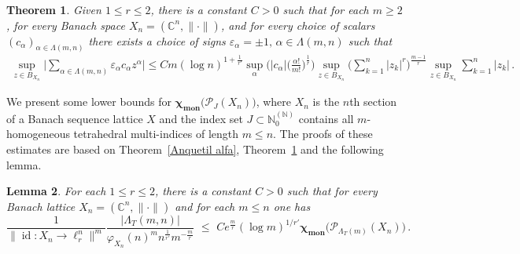 \documentclass[12pt]{amsart}
\numberwithin{subsection}{section}
\newtheorem{theorem}{Theorem}[section]
\newtheorem{lemma}[theorem]{Lemma}
\theoremstyle{definition}
\theoremstyle{remark}
\DeclareMathOperator{\mon}{mon}
\DeclareMathOperator{\id}{\mathrm{id}}
\newcommand{\chimon}{\chi_{\mon}}
\begin{document}
\medskip

\begin{theorem} \label{Hinault alfa}
Given  $1 \leq r \leq 2$, there is a constant $C >0$ such that for each  $m \geq 2$, for every Banach space $X_n = (\mathbb{C}^n,\|\cdot\|)$,
and for every choice of scalars $(c_{\alpha})_{\alpha \in \Lambda(m,n)}$ there exists a choice of signs $\varepsilon_{\alpha} = \pm1, \, \alpha \in \Lambda(m,n)$ such that
\begin{align*}
\sup_{z \in B_{X_n}} \Big\vert \sum_{\alpha \in \Lambda(m,n)} \varepsilon_{\alpha} c_{\alpha} z^{\alpha} \Big\vert
\leq C m (\log n)^{1+\frac{1}{r'}}   \sup_{\alpha}  \bigg( \vert c_{\alpha} \vert \Big( \frac{\alpha !}{m!} \Big)^{\frac{1}{r}} \bigg)
\sup_{z \in B_{X_n}} \Big( \sum_{k=1}^{n} \vert z_{k} \vert^{r} \Big)^{\frac{m-1}{r}}  \sup_{z \in B_{X_n}} \sum_{k=1}^{n} \vert z_{k} \vert\,.
\end{align*}
\end{theorem}

\smallskip

We present some lower bounds for $\boldsymbol{\chimon}\big(\mathcal{P}_J(X_n)\big)$, where $X_n$ is the $n$th section of a Banach sequence
lattice $X$ and the index set $J \subset \mathbb{N}_0^{(\mathbb{N})}$ contains all $m$-homogeneous tetrahedral multi-indices  of length $m\leq n$. The
proofs of these estimates are based on Theorem~\ref{Anquetil alfa}, Theorem~\ref{Hinault alfa} and  the following lemma.

\begin{lemma} \label{innichenA}
For each  $1 \leq r \leq 2$, there is a constant $C >0$ such that for every Banach  lattice $X_n = (\mathbb{C}^n, \|\cdot \|)$
and for each $m \le n$ one has
\[
\frac{1}{\|\id\colon X_n\to \ell_r^n\|^m}\frac{|\Lambda_T(m,n)|}{\varphi_{X_n}(n)^m n^{\frac{1}{r'}} m ^{-\frac{m}{r}}}
\,\,\leq\,\, C e^{\frac{m}{r}} (\log m)^{1/r'} \boldsymbol{\chimon}\big(\mathcal{P}_{\Lambda_T(m)}(X_n)\big)\,.
\]
\end{lemma}
\end{document}
